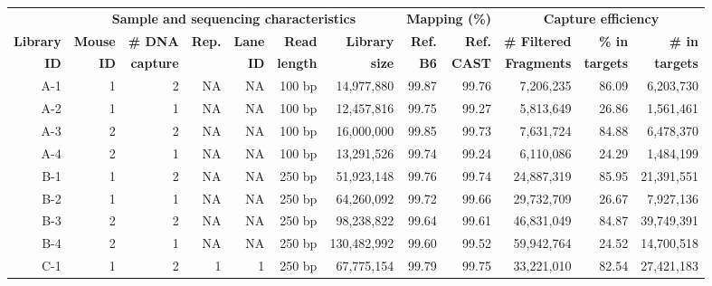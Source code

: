 \begin{sidewaystable}[p]
    \centering
	\begin{adjustbox}{width = 1\textwidth}
    \begin{tabular}{rrrrrrrrrrrr}
        \toprule
        \textbf{} & \multicolumn{6}{c}{\textbf{Sample and sequencing characteristics}} & \multicolumn{2}{c}{\textbf{Mapping (\%)}} & \multicolumn{3}{c}{\textbf{Capture efficiency}} \\
		\cmidrule(l){2-7} \cmidrule(l){8-9} \cmidrule(l){10-12}
        \textbf{Library} & \textbf{Mouse} & \textbf{\# DNA} & \textbf{Rep.} & \textbf{Lane} & \textbf{Read} & \textbf{Library} & \textbf{Ref.} & \textbf{Ref.} & \textbf{\# Filtered} & \textbf{\% in} & \textbf{\# in} \\
        \textbf{ID} & \textbf{ID} & \textbf{capture} & \textbf{} & \textbf{ID} & \textbf{length} & \textbf{size} & \textbf{B6} & \textbf{CAST} & \textbf{Fragments} & \textbf{targets} & \textbf{targets} \\
		\cmidrule(l){1-1} \cmidrule(l){2-7} \cmidrule(l){8-9} \cmidrule(l){10-12}
        A-1 & 1 & 2 & NA & NA & 100 bp & 14,977,880 & 99.87 & 99.76 & 7,206,235 & 86.09 & 6,203,730 \\
        A-2 & 1 & 1 & NA & NA & 100 bp & 12,457,816 & 99.75 & 99.27 & 5,813,649 & 26.86 & 1,561,461 \\
        A-3 & 2 & 2 & NA & NA & 100 bp & 16,000,000 & 99.85 & 99.73 & 7,631,724 & 84.88 & 6,478,370 \\
        A-4 & 2 & 1 & NA & NA & 100 bp & 13,291,526 & 99.74 & 99.24 & 6,110,086 & 24.29 & 1,484,199 \\
		\cmidrule(l){1-1} \cmidrule(l){2-7} \cmidrule(l){8-9} \cmidrule(l){10-12}
        B-1 & 1 & 2 & NA & NA & 250 bp & 51,923,148 & 99.76 & 99.74 & 24,887,319 & 85.95 & 21,391,551 \\
        B-2 & 1 & 1 & NA & NA & 250 bp & 64,260,092 & 99.72 & 99.66 & 29,732,709 & 26.67 & 7,927,136 \\
        B-3 & 2 & 2 & NA & NA & 250 bp & 98,238,822 & 99.64 & 99.61 & 46,831,049 & 84.87 & 39,749,391 \\
        B-4 & 2 & 1 & NA & NA & 250 bp & 130,482,992 & 99.60 & 99.52 & 59,942,764 & 24.52 & 14,700,518 \\
		\cmidrule(l){1-1} \cmidrule(l){2-7} \cmidrule(l){8-9} \cmidrule(l){10-12}
        C-1 & 1 & 2 & 1 & 1 & 250 bp & 67,775,154 & 99.79 & 99.75 & 33,221,010 & 82.54 & 27,421,183 \\

\end{tabular}
\end{adjustbox}
\end{sidewaystable}
